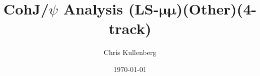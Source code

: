 \title{CohJ/$\psi$ Analysis (\textbf{LS}-$\boldsymbol{\mu\mu}$)(\textbf{Other})(\textbf{4-track})}
\author{Chris Kullenberg}
\date{\today}
